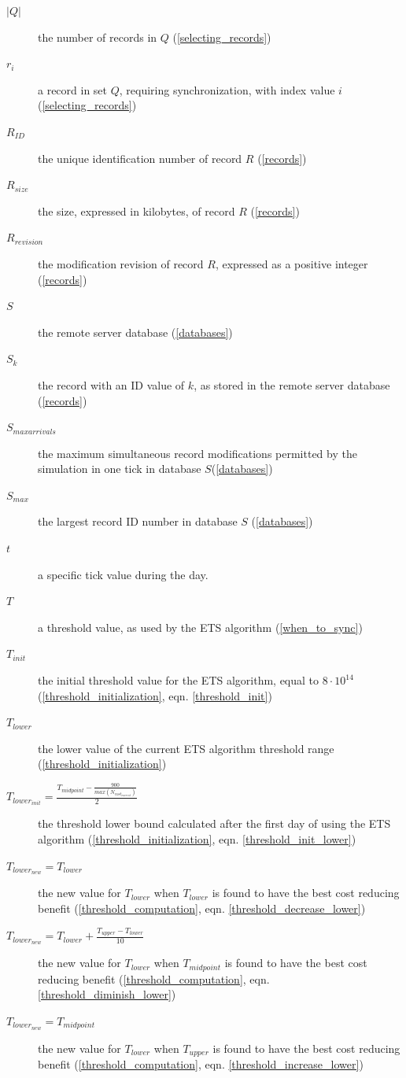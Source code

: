 \begin{description}
\item[$|Q|$] the number of records in $Q$ (\ref{selecting_records})
\item[$r_i$] a record in set $Q$, requiring synchronization, with index value $i$ (\ref{selecting_records})
\item[$R_{ID}$] the unique identification number of record $R$ (\ref{records})
\item[$R_{size}$] the size, expressed in kilobytes, of record $R$ (\ref{records})
\item[$R_{revision}$] the modification revision of record $R$, expressed as a positive integer (\ref{records})
\item[$S$] the remote server database (\ref{databases})
\item[$S_k$] the record with an ID value of $k$, as stored in the remote server database (\ref{records})
\item[$S_{max arrivals}$] the maximum simultaneous record modifications permitted by the simulation in one tick in database $S$(\ref{databases})
\item[$S_{max}$] the largest record ID number in database $S$ (\ref{databases})
\item[$t$] a specific tick value during the day.
\item[$T$] a threshold value, as used by the ETS algorithm (\ref{when_to_sync})
\item[$T_{init}$] the initial threshold value for the ETS algorithm, equal to $8 \cdot 10^{14}$ (\ref{threshold_initialization}, eqn. \ref{threshold_init})
\item[$T_{lower}$] the lower value of the current ETS algorithm threshold range (\ref{threshold_initialization})
\item[$T_{lower_{init}} = \frac{T_{midpoint} - \displaystyle\frac{900}{max(N_{cost_{current}})}}{2}$] the threshold lower bound calculated after the first day of using the ETS algorithm (\ref{threshold_initialization}, eqn. \ref{threshold_init_lower})
\item[$T_{lower_{new}} = T_{lower}$] the new value for $T_{lower}$ when $T_{lower}$ is found to have the best cost reducing benefit (\ref{threshold_computation}, eqn. \ref{threshold_decrease_lower})
\item[$T_{lower_{new}} = T_{lower} + \frac{T_{upper} - T_{lower}}{10}$] the new value for $T_{lower}$ when $T_{midpoint}$ is found to have the best cost reducing benefit (\ref{threshold_computation}, eqn. \ref{threshold_diminish_lower})
\item[$T_{lower_{new}} = T_{midpoint}$] the new value for $T_{lower}$ when $T_{upper}$ is found to have the best cost reducing benefit (\ref{threshold_computation}, eqn. \ref{threshold_increase_lower})

\end{description}

